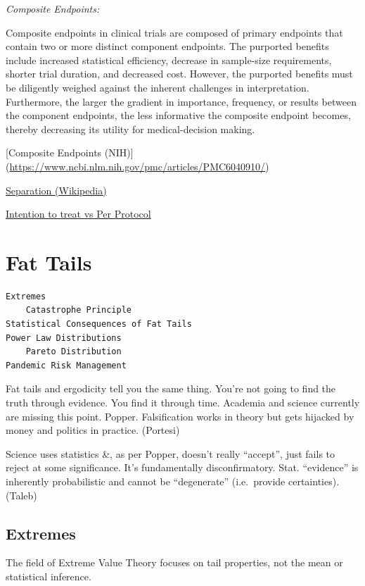 \documentclass[
]{book}
\begin{document}
\emph{Composite Endpoints:}

Composite endpoints in clinical trials are composed of primary endpoints that contain two or more distinct component endpoints. The purported benefits include increased statistical efficiency, decrease in sample-size requirements, shorter trial duration, and decreased cost. However, the purported benefits must be diligently weighed against the inherent challenges in interpretation. Furthermore, the larger the gradient in importance, frequency, or results between the component endpoints, the less informative the composite endpoint becomes, thereby decreasing its utility for medical-decision making.

{[}Composite Endpoints (NIH){]} (\url{https://www.ncbi.nlm.nih.gov/pmc/articles/PMC6040910/})

\href{https://en.wikipedia.org/wiki/Separation_(statistics)}{Separation (Wikipedia)}

\href{https://www.ncbi.nlm.nih.gov/pmc/articles/PMC5654877/}{Intention to treat vs Per Protocol}

\hypertarget{fat-tails}{%
\chapter{Fat Tails}\label{fat-tails}}

\begin{verbatim}
Extremes      
    Catastrophe Principle  
Statistical Consequences of Fat Tails  
Power Law Distributions  
    Pareto Distribution  
Pandemic Risk Management
\end{verbatim}

Fat tails and ergodicity tell you the same thing.
You're not going to find the truth through evidence.
You find it through time.
Academia and science currently are missing this point.
Popper. Falsification works in theory but gets hijacked by money and politics in practice.
(Portesi)

Science uses statistics \&, as per Popper, doesn't really ``accept'',
just fails to reject at some significance.
It's fundamentally disconfirmatory.
Stat. ``evidence'' is inherently probabilistic and
cannot be ``degenerate'' (i.e.~provide certainties).
(Taleb)

\hypertarget{extremes}{%
\section{Extremes}\label{extremes}}

The field of Extreme Value Theory focuses on tail properties,
not the mean or statistical inference.
\end{document}
